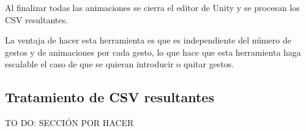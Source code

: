 Al finalizar todas las animaciones se cierra el editor de Unity y se procesan los CSV resultantes.

La ventaja de hacer esta herramienta es que es independiente del número de gestos y de animaciones por cada gesto, lo que hace que esta herramienta haga escalable el caso de que se quieran introducir o quitar gestos.

\subsection{Tratamiento de CSV resultantes}

TO DO: SECCIÓN POR HACER